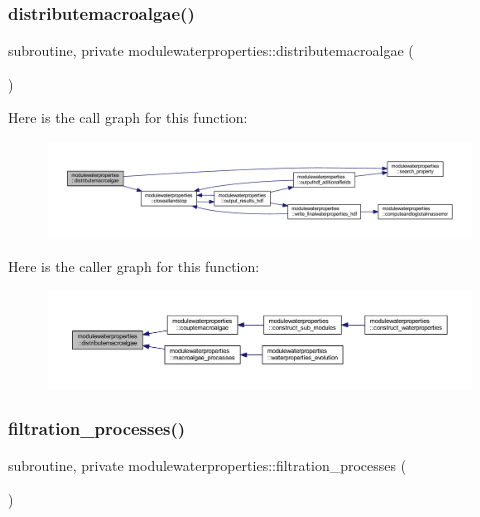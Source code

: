 \subsubsection{\texorpdfstring{distributemacroalgae()}{distributemacroalgae()}}
{\footnotesize\ttfamily subroutine, private modulewaterproperties\+::distributemacroalgae (\begin{DoxyParamCaption}{ }\end{DoxyParamCaption})\hspace{0.3cm}{\ttfamily [private]}}

Here is the call graph for this function\+:\nopagebreak
\begin{figure}[H]
\begin{center}
\leavevmode
\includegraphics[width=350pt]{namespacemodulewaterproperties_a45571c439a7d4a05be3b427eb5ff0b9a_cgraph}
\end{center}
\end{figure}
Here is the caller graph for this function\+:\nopagebreak
\begin{figure}[H]
\begin{center}
\leavevmode
\includegraphics[width=350pt]{namespacemodulewaterproperties_a45571c439a7d4a05be3b427eb5ff0b9a_icgraph}
\end{center}
\end{figure}
\mbox{\label{namespacemodulewaterproperties_a58f066775e7df388495e6602c2d567e6}} 
\subsubsection{\texorpdfstring{filtration\+\_\+processes()}{filtration\_processes()}}
{\footnotesize\ttfamily subroutine, private modulewaterproperties\+::filtration\+\_\+processes (\begin{DoxyParamCaption}{ }\end{DoxyParamCaption})\hspace{0.3cm}{\ttfamily [private]}}

